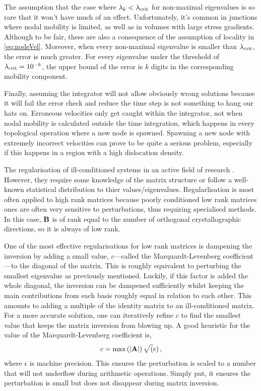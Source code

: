The assumption that the case where $\lambda_k < \lambda_{\textrm{crit}}$ for non-maximal eigenvalues is so rare that it won't have much of an effect. Unfortunately, it's common in junctions where nodal mobility is limited, as well as in volumes with large stress gradients. Although to be fair, these are also a consequence of the assumption of locality in \cref{eq:nodeVel}. Moreover, when every non-maximal eigenvalue is smaller than $\lambda_{\textrm{crit}}$, the error is much greater. For every eigenvalue under the threshold of $\lambda_{\textrm{crit}} = 10^{-k}$, the upper bound of the error is $k$ digits in the corresponding mobility component.

Finally, assuming the integrator will not allow obviously wrong solutions because it will fail the error check and reduce the time step is not something to hang our hats on. Erroneous velocities only get caught within the integrator, not when nodal mobility is calculated outside the time integration, which happens in every topological operation where a new node is spawned. Spawning a new node with extremely incorrect velocities can prove to be quite a serious problem, especially if this happens in a region with a high dislocation density.

The regularisation of ill-conditioned systems in an active field of research \cite{regularisation1,regularisation2,regularisation3}. However, they require some knowledge of the matrix structure or follow a well-known statistical distribution to thier values/eigenvalues. Regularlisation is most often applied to high rank matrices because poorly conditioned low rank matrices ones are often very sensitive to perturbations, thus requiring specialised methods. In this case, $\mathbf{B}$ is of rank equal to the number of orthogonal crystallographic directions, so it is always of low rank.

One of the most effective regularisations for low rank matrices is dampening the inversion by adding a small value, $c$---called the Marquardt-Levenberg coefficient---to the diagonal of the matrix. This is roughly equivalent to perturbing the smallest eigenvalue as previously mentioned. Luckily, if this factor is added the whole diagonal, the inversion can be dampened sufficiently whilst keeping the main contributions from each basis roughly equal in relation to each other. This amounts to adding a multiple of the identity matrix to an ill-conditioned matrix. For a more accurate solution, one can iteratively refine $c$ to find the smallest value that keeps the matrix inversion from blowing up. A good heuristic for the value of the Marquardt-Levenberg coefficient is,
\begin{align}\label{eq:marquardt}
    c = \max\left(\lvert\mathbf{A}\rvert\right) \sqrt(\epsilon)\,,
\end{align}
where $\epsilon$ is machine precision. This ensures the perturbation is scaled to a number that will not underflow during arithmetic operations. Simply put, it ensures the perturbation is small but does not disappear during matrix inversion.

